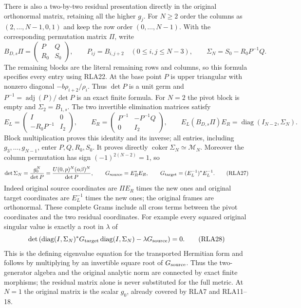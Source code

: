 There is also a two-by-two residual presentation directly in the
original orthonormal matrix, retaining all the higher $g_j$.
For $N\ge2$ order the columns as $(2,\ldots,N-1,0,1)$ and keep
the row order $(0,\ldots,N-1)$.  With the corresponding permutation
matrix $\Pi$, write
\[
 B_{D,s}\Pi=\begin{pmatrix}P&Q\\R_0&S_0\end{pmatrix},\qquad
 P_{ij}=B_{i,j+2}\quad(0\le i,j\le N-3),\qquad
 \Sigma_N=S_0-R_0P^{-1}Q.
 \tag{RLA25}
\]
The remaining blocks are the literal remaining rows and columns,
so this formula specifies every entry using RLA22.
At the base point $P$ is upper triangular with nonzero diagonal
$-b\rho_{i+2}/\rho_i$.  Thus $\det P$ is a unit germ and
$P^{-1}=\operatorname{adj}(P)/\det P$ is an exact finite formula.
For $N=2$ the pivot block is empty and $\Sigma_2=B_{1,s}$.
The two invertible elimination matrices satisfy
\[
 E_L=\begin{pmatrix}I&0\\-R_0P^{-1}&I_2\end{pmatrix},\qquad
 E_R=\begin{pmatrix}P^{-1}&-P^{-1}Q\\0&I_2\end{pmatrix},\qquad
 E_L(B_{D,s}\Pi)E_R=\operatorname{diag}(I_{N-2},\Sigma_N).
 \tag{RLA26}
\]
Block multiplication proves this identity and its inverse; all
entries, including $g_3,\ldots,g_{N-1}$, enter $P,Q,R_0,S_0$.
It proves directly $\operatorname{coker}\Sigma_N\simeq\mathcal M_N$.
Moreover the column permutation has sign $(-1)^{2(N-2)}=1$, so
\[
 \det\Sigma_N=\frac{g_0^N}{\det P}
       =\frac{U(0,p)^N(\alpha\beta)^N}{\det P},\qquad
 G_{\rm source}=E_R^*E_R,\qquad
 G_{\rm target}=(E_L^{-1})^*E_L^{-1}.
 \tag{RLA27}
\]
Indeed original source coordinates are $\Pi E_R$ times the new
ones and original target coordinates are $E_L^{-1}$ times the
new ones; the original frames are orthonormal.
These complete Grams include all cross terms between the pivot
coordinates and the two residual coordinates.
For example every squared original singular value is exactly a
root in $\lambda$ of
\[
 \det\left(
 \operatorname{diag}(I,\Sigma_N)^*G_{\rm target}
 \operatorname{diag}(I,\Sigma_N)-\lambda G_{\rm source}\right)=0.
 \tag{RLA28}
\]
This is the defining eigenvalue equation for the transported
Hermitian form and follows by multiplying by an invertible square
root of $G_{\rm source}$.  Thus the two-generator algebra and the
original analytic norm are connected by exact finite morphisms;
the residual matrix alone is never substituted for the full metric.
At $N=1$ the original matrix is the scalar $g_0$, already covered
by RLA7 and RLA11--18.

